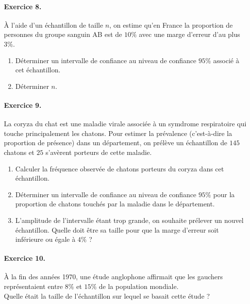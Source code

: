 \documentclass[11pt]{article}
\begin{document}
\paragraph{Exercice 8.} À l’aide d’un échantillon de taille $n$, on estime qu’en France la proportion de
personnes du groupe sanguin AB est de $10\%$ avec une marge d’erreur d’au plus
$3\%$.
\begin{enumerate}
  \item Déterminer un intervalle de confiance au niveau de confiance $95\%$ associé à cet échantillon.
  \item Déterminer $n$.
\end{enumerate}

\paragraph{Exercice 9.} La coryza du chat est une maladie virale associée à un symdrome respiratoire
qui touche principalement les chatons. Pour estimer la prévalence (c'est-à-dire la proportion
de présence) dans un département, on prélève un échantillon de $145$ chatons et
$25$ s'avèrent porteurs de cette maladie.
\begin{enumerate}
  \item Calculer la fréquence observée de chatons porteurs du coryza dans cet échantillon.
  \item Déterminer un intervalle de confiance au niveau de confiance $95\%$ pour la proportion de
chatons touchés par la maladie dans le département.
 \item L’amplitude de l’intervalle étant trop grande, on souhaite prélever un nouvel échantillon.
Quelle doit être sa taille pour que la marge d’erreur soit inférieure ou égale à
$4\%$ ?
\end{enumerate}

\paragraph{Exercice 10.} À la fin des années 1970, une étude anglophone affirmait que les gauchers représentaient entre $8\%$ et $15\%$ de la population mondiale.\\
Quelle était la taille de l’échantillon sur lequel se basait cette étude ?
\end{document}
